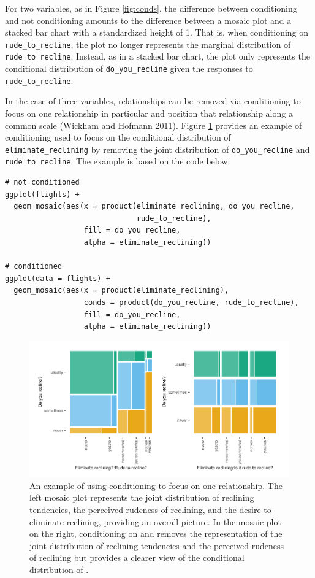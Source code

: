 For two variables, as in Figure \ref{fig:conds}, the difference between conditioning and not conditioning amounts to the difference between a mosaic plot and a stacked bar chart with a standardized height of 1. That is, when conditioning on \texttt{rude\_to\_recline}, the plot no longer represents the marginal distribution of \texttt{rude\_to\_recline}. Instead, as in a stacked bar chart, the plot only represents the conditional distribution of \texttt{do\_you\_recline} given the responses to \texttt{rude\_to\_recline}.

In the case of three variables, relationships can be removed via conditioning to focus on one relationship in particular and position that relationship along a common scale (Wickham and Hofmann 2011). Figure \ref{fig:conds3} provides an example of conditioning used to focus on the conditional distribution of \texttt{eliminate\_reclining} by removing the joint distribution of \texttt{do\_you\_recline} and \texttt{rude\_to\_recline}. The example is based on the code below.

\begin{verbatim}
# not conditioned
ggplot(flights) +
  geom_mosaic(aes(x = product(eliminate_reclining, do_you_recline,
                              rude_to_recline), 
                  fill = do_you_recline, 
                  alpha = eliminate_reclining))

# conditioned 
ggplot(data = flights) +
  geom_mosaic(aes(x = product(eliminate_reclining), 
                  conds = product(do_you_recline, rude_to_recline), 
                  fill = do_you_recline, 
                  alpha = eliminate_reclining))
\end{verbatim}

\begin{figure}

{\centering \includegraphics[width=1\linewidth]{RJ-2023-013_files/figure-latex/conds3-1} 

}

\caption{An example of using conditioning to focus on one relationship. The left mosaic plot represents the joint distribution of reclining tendencies, the perceived rudeness of reclining, and the desire to eliminate reclining, providing an overall picture. In the mosaic plot on the right, conditioning on  and  removes the representation of the joint distribution of reclining tendencies and the perceived rudeness of reclining but provides a clearer view of the conditional distribution of .}\label{fig:conds3}
\end{figure}

